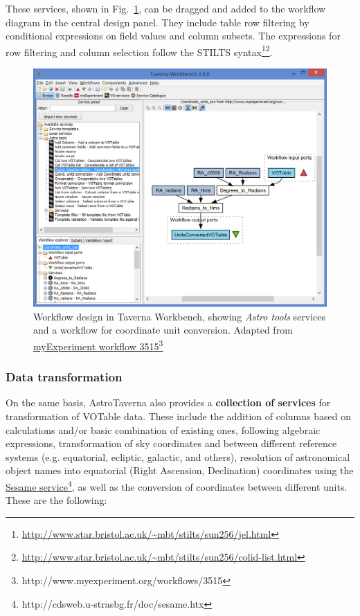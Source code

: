 \documentclass{aa}
\newcommand{\urlwofont}[1]{\urlstyle{same}\url{#1}}
\begin{document}
These services, shown in Fig.~\ref{fig:design}, can be dragged and added to the workflow diagram in the central design panel. They include table row filtering by conditional expressions on field values and column subsets.  The expressions for row filtering and column selection follow the STILTS syntax\footnote{\urlwofont{http://www.star.bristol.ac.uk/~mbt/stilts/sun256/jel.html}}\fnmsep\footnote{\urlwofont{http://www.star.bristol.ac.uk/~mbt/stilts/sun256/colid-list.html}}.

\begin{figure}[tb]
\centering 
\includegraphics[width=0.99\columnwidth]{design}
\caption{Workflow design in Taverna Workbench, showing \textit{Astro tools} services and a workflow for coordinate unit conversion. Adapted from \href{http://www.myexperiment.org/workflows/3515}{myExperiment workflow 3515}\protect\footnote{http://www.myexperiment.org/workflows/3515}}
\label{fig:design}
\end{figure}

\subsubsection{Data transformation}
\label{DataTransformation}

On the same basis, AstroTaverna also provides a \textbf{collection of services} for transformation of VOTable data. These include the addition of columns based on calculations and/or basic combination of existing ones, following algebraic expressions, transformation of sky coordinates and between different reference systems (e.g. equatorial, ecliptic, galactic, and others), resolution of astronomical object names into equatorial (Right Ascension, Declination) coordinates using the \href{http://cdsweb.u-strasbg.fr/doc/sesame.htx}{Sesame service}\footnote{http://cdsweb.u-strasbg.fr/doc/sesame.htx}, as well as the conversion of coordinates between different units. These are the following:
\end{document}

